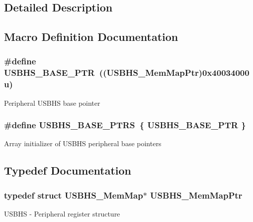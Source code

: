 \subsection{Detailed Description}


\subsection{Macro Definition Documentation}
\hypertarget{group___u_s_b_h_s___peripheral_gaa2bc10b8cd66f96acd39e15b3a581306}{}
\subsubsection[{U\+S\+B\+H\+S\+\_\+\+B\+A\+S\+E\+\_\+\+P\+T\+R}]{\setlength{\rightskip}{0pt plus 5cm}\#define U\+S\+B\+H\+S\+\_\+\+B\+A\+S\+E\+\_\+\+P\+T\+R~(({\bf U\+S\+B\+H\+S\+\_\+\+Mem\+Map\+Ptr})0x40034000u)}\label{group___u_s_b_h_s___peripheral_gaa2bc10b8cd66f96acd39e15b3a581306}
Peripheral U\+S\+B\+H\+S base pointer \hypertarget{group___u_s_b_h_s___peripheral_ga294121020be1028778e1508a789d7105}{}
\subsubsection[{U\+S\+B\+H\+S\+\_\+\+B\+A\+S\+E\+\_\+\+P\+T\+R\+S}]{\setlength{\rightskip}{0pt plus 5cm}\#define U\+S\+B\+H\+S\+\_\+\+B\+A\+S\+E\+\_\+\+P\+T\+R\+S~\{ {\bf U\+S\+B\+H\+S\+\_\+\+B\+A\+S\+E\+\_\+\+P\+T\+R} \}}\label{group___u_s_b_h_s___peripheral_ga294121020be1028778e1508a789d7105}
Array initializer of U\+S\+B\+H\+S peripheral base pointers 

\subsection{Typedef Documentation}
\hypertarget{group___u_s_b_h_s___peripheral_gad58a0f182a04a4f695b4e3f7043111a2}{}
\subsubsection[{U\+S\+B\+H\+S\+\_\+\+Mem\+Map\+Ptr}]{\setlength{\rightskip}{0pt plus 5cm}typedef struct {\bf U\+S\+B\+H\+S\+\_\+\+Mem\+Map}$\ast$ {\bf U\+S\+B\+H\+S\+\_\+\+Mem\+Map\+Ptr}}\label{group___u_s_b_h_s___peripheral_gad58a0f182a04a4f695b4e3f7043111a2}
U\+S\+B\+H\+S -\/ Peripheral register structure 